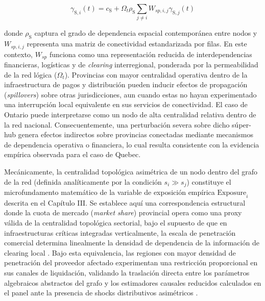 \begin{equation}
\gamma_{\text{S},i}(t) = c_{\text{S}} + \Omega_t \rho_{\text{S}} \sum_{j \neq i} W_{sp,i,j}\gamma_{\text{S},j}(t)
\end{equation}

donde $\rho_{\text{S}}$ captura el grado de dependencia espacial contempor\'anea entre nodos y $W_{sp,i,j}$ representa una matriz de conectividad estandarizada por filas. En este contexto, $W_{sp}$ funciona como una representaci\'on reducida de interdependencias financieras, log\'isticas y de \textit{clearing} interregional, ponderada por la permeabilidad de la red l\'ogica ($\Omega_t$). Provincias con mayor centralidad operativa dentro de la infraestructura de pagos y distribuci\'on pueden inducir efectos de propagaci\'on (\textit{spillovers}) sobre otras jurisdicciones, aun cuando estas no hayan experimentado una interrupci\'on local equivalente en sus servicios de conectividad. El caso de Ontario puede interpretarse como un nodo de alta centralidad relativa dentro de la red nacional. Consecuentemente, una perturbaci\'on severa sobre dicho s\'uper-hub genera efectos indirectos sobre provincias conectadas mediante mecanismos de dependencia operativa o financiera, lo cual resulta consistente con la evidencia emp\'irica observada para el caso de Quebec.

Mec\'anicamente, la centralidad topol\'ogica asim\'etrica de un nodo dentro del grafo de la red (definida anal\'iticamente por la condici\'on $s_i \gg s_j$) constituye el microfundamento matem\'atico de la variable de exposici\'on emp\'irica $\text{Exposure}_i$ descrita en el Cap\'itulo III. Se establece aqu\'i una correspondencia estructural donde la cuota de mercado (\textit{market share}) provincial opera como una proxy v\'alida de la centralidad topol\'ogica sectorial, bajo el supuesto de que en infraestructuras cr\'iticas integradas verticalmente, la escala de penetraci\'on comercial determina linealmente la densidad de dependencia de la informaci\'on de clearing local \citep{gabaix2011granular}. Bajo esta equivalencia, las regiones con mayor densidad de penetraci\'on del proveedor afectado experimentan una restricci\'on proporcional en sus canales de liquidaci\'on, validando la traslaci\'on directa entre los par\'ametros algebraicos abstractos del grafo y los estimadores causales reducidos calculados en el panel ante la presencia de shocks distributivos asim\'etricos \citep{acemoglu2012network}.

